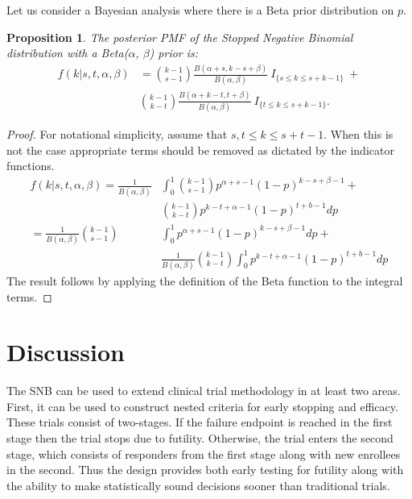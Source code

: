 \documentclass[review]{elsarticle}
\newtheorem{prop}{Proposition}
\begin{document}
Let us consider a Bayesian analysis where there is a Beta prior distribution
on $p$.
\begin{prop} \label{prop:bayesian}
The posterior PMF of the Stopped Negative Binomial distribution with a Beta($\alpha$, $\beta$) prior is:
\begin{align} \label{eqn:posterior}
f(k | s, t, \alpha, \beta) &= 
  {k-1 \choose s-1} \frac{B\left(\alpha+s, k-s+\beta \right)}{B(\alpha, \beta)} 
    \ I_{\{s \leq k \leq s+k-1\}} \ + \nonumber \\
  & {k-1 \choose k-t} 
    \frac{B\left(\alpha + k - t, t+\beta\right)}{B(\alpha, \beta)} 
    \ I_{\{t \leq k \leq s+k-1\}}.
\end{align}
\end{prop}
\begin{proof}
For notational simplicity, assume that $s,t \leq k \leq s+t-1$. When this is not the case appropriate terms should be removed as dictated by the indicator functions.
\begin{align*}
f(k | s, t, \alpha, \beta) = \frac{1}{B(\alpha, \beta)} & \int_0^1 {k-1 \choose s-1} p^{\alpha +s -1} \left(1-p\right)^{k-s+\beta-1} + \\
 & {k-1 \choose k-t} p^{k-t+\alpha-1}\left(1-p\right)^{t+b-1} dp \\
= \frac{1}{B(\alpha, \beta)}  {k-1 \choose s-1} & \int_0^1  p^{\alpha +s -1} \left(1-p\right)^{k-s+\beta-1} dp + \\
 & \frac{1}{B(\alpha, \beta)} {k-1 \choose k-t} \int_0^1  p^{k-t+\alpha-1}\left(1-p\right)^{t+b-1} dp
\end{align*}
The result follows by applying the definition of the Beta function to the integral terms.
\end{proof}

\section{Discussion}

The SNB can be used to extend clinical trial methodology
in at least two areas. First, it can be used to construct nested criteria
for early stopping and efficacy. These trials consist of two-stages.
If the failure endpoint is reached in the first stage then the 
trial stops due to futility. Otherwise, the trial enters the second 
stage, which consists of responders from the first stage along with
new enrollees in the second. Thus the design provides
both early testing for futility along with the ability
to make statistically sound decisions sooner than traditional trials.
\end{document}
